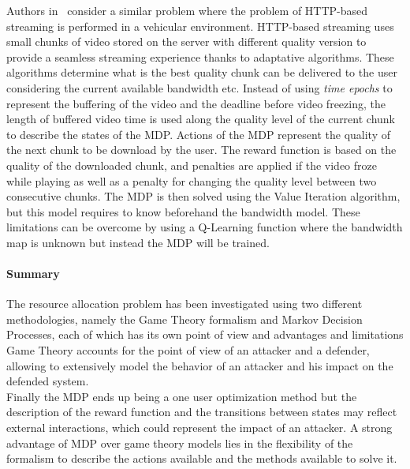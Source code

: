 Authors in~\cite{Bokani2015} consider a similar problem where the problem of HTTP-based streaming is performed in a vehicular environment.
HTTP-based streaming uses small chunks of video stored on the server with different quality version to provide a seamless streaming experience thanks to adaptative algorithms. 
These algorithms determine what is the best quality chunk can be delivered to the user considering the current available bandwidth etc. Instead of using \textit{time epochs} to represent the buffering of the video and the deadline before video freezing, the length of buffered video time is used along the quality level of the current chunk to describe the states of the MDP. 
Actions of the MDP represent the quality of the next chunk to be download by the user.
The reward function is based on the quality of the downloaded chunk, and penalties are applied if the video froze while playing as well as a penalty for changing the quality level between two consecutive chunks.
The MDP is then solved using the Value Iteration algorithm, but this model requires to know beforehand the bandwidth model. 
These limitations can be overcome by using a Q-Learning function where the bandwidth map is unknown but instead the MDP will be trained.

\paragraph{Summary}
The resource allocation problem has been investigated using two different methodologies, namely the Game Theory formalism and Markov Decision Processes, each of which has its own point of view and advantages and limitations
Game Theory accounts for the point of view of an attacker and a defender, allowing to extensively model the behavior of an attacker and his impact on the defended system.\\
Finally the MDP ends up being a one user optimization method but the description of the reward function and the transitions between states may reflect external interactions, which could represent the impact of an attacker.
A strong advantage of MDP over game theory models lies in the flexibility of the formalism to describe the actions available and the methods available to solve it.


